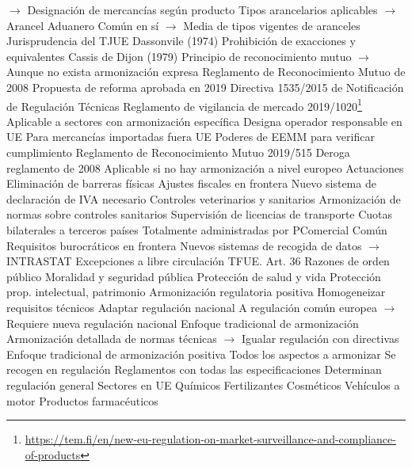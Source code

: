 \documentclass{nuevotema}
\begin{document}
\begin{esquemal}
				\4[] $\to$ Designación de mercancías según producto
				\4[] Tipos arancelarios aplicables
				\4[] $\to$ Arancel Aduanero Común en sí
				\4[] $\to$ Media de tipos vigentes de aranceles
			\3 Jurisprudencia del TJUE
				\4 Dassonvile (1974)
				\4[] Prohibición de exacciones y equivalentes
				\4 Cassis de Dijon (1979)
				\4[] Principio de reconocimiento mutuo
				\4[] $\to$ Aunque no exista armonización expresa
			\3 Reglamento de Reconocimiento Mutuo de 2008
				\4 Propuesta de reforma aprobada en 2019
			\3 Directiva 1535/2015 de Notificación de Regulación Técnicas
			\3 Reglamento de vigilancia de mercado 2019/1020\footnote{\url{https://tem.fi/en/new-eu-regulation-on-market-surveillance-and-compliance-of-products}}
				\4 Aplicable a sectores con armonización específica
				\4 Designa operador responsable en UE
				\4[] Para mercancías importadas fuera UE
				\4 Poderes de EEMM para verificar cumplimiento
			\3 Reglamento de Reconocimiento Mutuo 2019/515
				\4 Deroga reglamento de 2008
				\4 Aplicable si no hay armonización a nivel europeo
		\2 Actuaciones
			\3 Eliminación de barreras físicas
				\4 Ajustes fiscales en frontera
				\4[] Nuevo sistema de declaración de IVA necesario
				\4 Controles veterinarios y sanitarios
				\4[] Armonización de normas sobre controles sanitarios
				\4 Supervisión de licencias de transporte
				\4 Cuotas bilaterales a terceros países
				\4[] Totalmente administradas por PComercial Común
				\4 Requisitos burocráticos en frontera
				\4[] Nuevos sistemas de recogida de datos
				\4[] $\to$ INTRASTAT
			\3 Excepciones a libre circulación
				\4 TFUE. Art. 36
				\4[] Razones de orden público
				\4[] Moralidad y seguridad pública
				\4[] Protección de salud y vida
				\4[] Protección prop. intelectual, patrimonio
			\3 Armonización regulatoria positiva
				\4 Homogeneizar requisitos técnicos
				\4 Adaptar regulación nacional
				\4[] A regulación común europea
				\4[] $\to$ Requiere nueva regulación nacional
				\4 Enfoque tradicional de armonización
				\4[] Armonización detallada de normas técnicas
				\4[] $\to$ Igualar regulación con directivas
			\3 Enfoque tradicional de armonización positiva
				\4 Todos los aspectos a armonizar
				\4[] Se recogen en regulación
				\4 Reglamentos con todas las especificaciones
				\4[] Determinan regulación general
				\4 Sectores en UE
				\4[] Químicos
				\4[] Fertilizantes
				\4[] Cosméticos
				\4[] Vehículos a motor
				\4[] Productos farmacéuticos

\end{esquemal}
\end{document}
